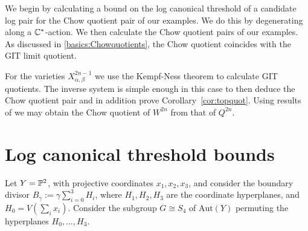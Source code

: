 We begin by calculating a bound on the log canonical threshold of a candidate log pair for the Chow quotient pair of our examples. We do this by degenerating along a \(\mathbb{C}^*\)-action. We then calculate the Chow quotient pairs of our examples. As discussed in \ref{basics:Chowquotients}, the Chow quotient coincides with the GIT limit quotient.

For the varieties \(X_{\alpha,\beta}^{2n-1}\) we use the Kempf-Ness theorem to calculate GIT quotients. The inverse system is simple enough in this case to then deduce the Chow quotient pair and in addition prove Corollary~\ref{cor:topquot}. Using results of \cite{kirwan} we may obtain the Chow quotient of \(W^{2n}\) from that of \(Q^{2n}\).
%
%
%
%
%
%
%
%
%
%
%
%
\section{Log canonical threshold bounds}
Let \(Y = \mathbb{P}^2\), with projective coordinates \(x_1,x_2,x_3\), and consider the boundary divisor \(B_\gamma  := \gamma \sum_{i=0}^3  H_i\), where \(H_1,H_2,H_3\) are the coordinate hyperplanes, and \(H_0 = V (\sum_i x_i) \). Consider the subgroup \(G \cong S_4\) of \(\text{Aut}(Y)\) permuting the hyperplanes \(H_0,\dots,H_3\).

